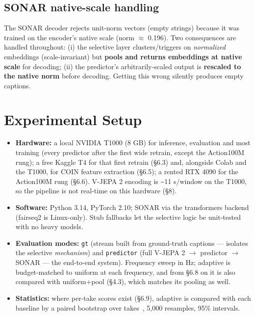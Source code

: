 \subsection{SONAR native-scale handling}

The SONAR decoder rejects unit-norm vectors (empty strings) because it was trained on the encoder's native scale (norm $\approx$ 0.196). Two consequences are handled throughout: (i) the selective layer clusters/triggers on \emph{normalized} embeddings (scale-invariant) but \textbf{pools and returns embeddings at native scale} for decoding; (ii) the predictor's arbitrarily-scaled output is \textbf{rescaled to the native norm} before decoding. Getting this wrong silently produces empty captions.

\medskip

\section{Experimental Setup}

\begin{itemize}
\item \textbf{Hardware:} a local NVIDIA T1000 (8 GB) for inference, evaluation and most training (every predictor after the first wide retrain, except the Action100M rung); a free Kaggle T4 for that first retrain (\S6.3) and, alongside Colab and the T1000, for COIN feature extraction (\S6.5); a rented RTX 4090 for the Action100M rung (\S6.6). V-JEPA 2 encoding is \textasciitilde{}11 s/window on the T1000, so the pipeline is not real-time on this hardware (\S8).
\item \textbf{Software:} Python 3.14, PyTorch 2.10; SONAR via the transformers backend (fairseq2 is Linux-only). Stub fallbacks let the selective logic be unit-tested with no heavy models.
\item \textbf{Evaluation modes:} \texttt{gt} (stream built from ground-truth captions --- isolates the selective \emph{mechanism}) and \texttt{predictor} (full V-JEPA 2 $\rightarrow$ predictor $\rightarrow$ SONAR --- the end-to-end system). Frequency sweep in Hz; adaptive is budget-matched to uniform at each frequency, and from \S6.8 on it is also compared with uniform+pool (\S4.3), which matches its pooling as well.
\item \textbf{Statistics:} where per-take scores exist (\S6.9), adaptive is compared with each baseline by a paired bootstrap over takes~\cite{efron1993}, 5,000 resamples, 95\% intervals.
\end{itemize}

